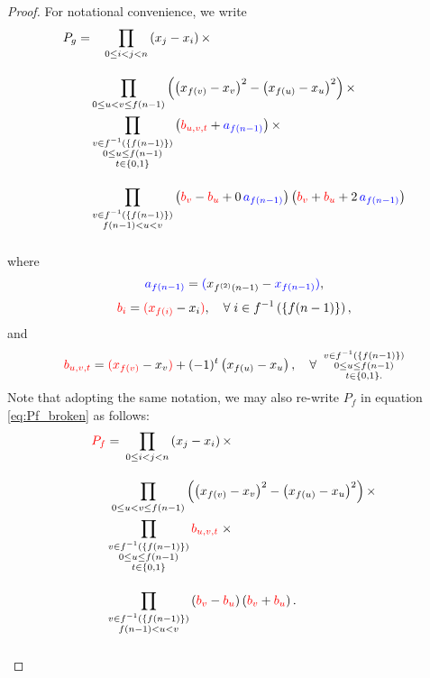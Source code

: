 \begin{proof}
For notational convenience, we write 
\begin{equation}
\begin{aligned}P_{g}= & \quad\prod_{0\leq i<j<n}\left(x_{j}-x_{i}\right)\times\\[10pt]
 & \prod_{0\leq u<v\leq f\left(n-1\right)}\left(\left(x_{f(v)}-x_{v}\right)^{2}-\left(x_{f(u)}-x_{u}\right)^{2}\right)\times\\
 & \prod_{\substack{v\in f^{-1}\left(\{f(n-1)\}\right)\\
0\leq u\leq f\left(n-1\right)\\
t\in\{0,1\}
}
}\left({\color{red}b_{u,v,t}}+{\color{blue}a_{f(n-1)}}\right)\times\\[10pt]
 & \prod_{\substack{v\in f^{-1}\left(\{f(n-1)\}\right)\\
f\left(n-1\right)<u<v
}
}\left({\color{red}b_{v}}-{\color{red}b_{u}}+0\,{\color{blue}a_{f(n-1)}}\right)\left({\color{red}b_{v}}+{\color{red}b_{u}}+2\,{\color{blue}a_{f(n-1)}}\right)\\[10pt]
\end{aligned}
\label{eq:Pg_telescoping}
\end{equation}
where
\[
{\color{blue} a_{f(n-1)}} = {\color{blue} (} x_{f^{(2)}(n-1)} - {\color{blue} x_{f(n-1)} )},
\]
\[
{\color{red} b_{i}} = {\color{red} ( x_{f(i)} }- x_{i}  {\color{red} )}, 
\quad \forall \; i \in f^{-1}\left(\{f(n-1)\}\right),
\]
and
\[
{\color{red} b_{u,v,t}} = {\color{red} ( x_{f(v)}} - x_{v} {\color{red})} 
+ (-1)^{t} \left( x_{f(u)} - x_{u} \right), 
\quad \forall \;\;
\substack{
    v \in f^{-1}\left(\{f(n-1)\}\right) \\
    0 \leq u \leq f(n-1) \\
    t \in \{0, 1\}.
}
\]
Note that adopting the same notation, we may also re-write $P_f$ in equation \eqref{eq:Pf_broken} as follows:
\begin{equation}
\begin{aligned}{\color{red}P_{f}} & =\:\prod_{0\leq i<j<n}\left(x_{j}-x_{i}\right)\times\\[10pt]
 & \;\prod_{0\leq u<v\leq f\left(n-1\right)}\left(\left(x_{f(v)}-x_{v}\right)^{2}-\left(x_{f(u)}-x_{u}\right)^{2}\right)\times\\
 & \prod_{\substack{v\in f^{-1}\left(\{f(n-1)\}\right)\\
0\leq u\leq f(n-1)\\
t\in\{0,1\}
}
}{\color{red}b_{u,v,t}}\;\times\\[10pt]
 & \prod_{\substack{v\in f^{-1}\left(\{f(n-1)\}\right)\\
f(n-1)<u<v
}
}\left({\color{red}b_{v}}-{\color{red}b_{u}}\right)\left({\color{red}b_{v}}+{\color{red}b_{u}}\right).\\[10pt]
\end{aligned}
\label{eq:Pf_rewrite}
\end{equation}


\end{proof}
